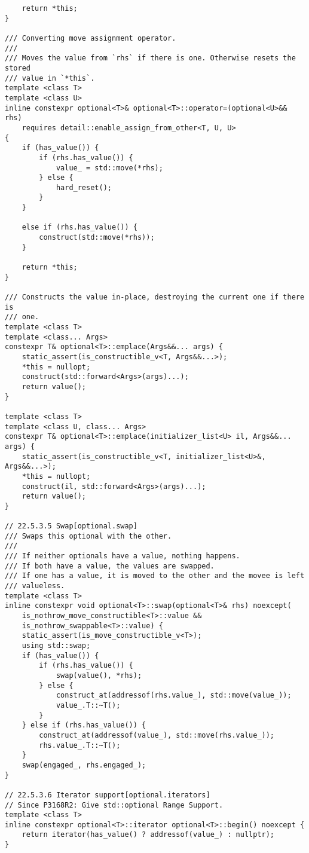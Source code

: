 \documentclass[a4paper,10pt,oneside,openany,final,article]{memoir}
\begin{document}
\begin{verbatim}
    return *this;
}

/// Converting move assignment operator.
///
/// Moves the value from `rhs` if there is one. Otherwise resets the stored
/// value in `*this`.
template <class T>
template <class U>
inline constexpr optional<T>& optional<T>::operator=(optional<U>&& rhs)
    requires detail::enable_assign_from_other<T, U, U>
{
    if (has_value()) {
        if (rhs.has_value()) {
            value_ = std::move(*rhs);
        } else {
            hard_reset();
        }
    }

    else if (rhs.has_value()) {
        construct(std::move(*rhs));
    }

    return *this;
}

/// Constructs the value in-place, destroying the current one if there is
/// one.
template <class T>
template <class... Args>
constexpr T& optional<T>::emplace(Args&&... args) {
    static_assert(is_constructible_v<T, Args&&...>);
    *this = nullopt;
    construct(std::forward<Args>(args)...);
    return value();
}

template <class T>
template <class U, class... Args>
constexpr T& optional<T>::emplace(initializer_list<U> il, Args&&... args) {
    static_assert(is_constructible_v<T, initializer_list<U>&, Args&&...>);
    *this = nullopt;
    construct(il, std::forward<Args>(args)...);
    return value();
}

// 22.5.3.5 Swap[optional.swap]
/// Swaps this optional with the other.
///
/// If neither optionals have a value, nothing happens.
/// If both have a value, the values are swapped.
/// If one has a value, it is moved to the other and the movee is left
/// valueless.
template <class T>
inline constexpr void optional<T>::swap(optional<T>& rhs) noexcept(
    is_nothrow_move_constructible<T>::value &&
    is_nothrow_swappable<T>::value) {
    static_assert(is_move_constructible_v<T>);
    using std::swap;
    if (has_value()) {
        if (rhs.has_value()) {
            swap(value(), *rhs);
        } else {
            construct_at(addressof(rhs.value_), std::move(value_));
            value_.T::~T();
        }
    } else if (rhs.has_value()) {
        construct_at(addressof(value_), std::move(rhs.value_));
        rhs.value_.T::~T();
    }
    swap(engaged_, rhs.engaged_);
}

// 22.5.3.6 Iterator support[optional.iterators]
// Since P3168R2: Give std::optional Range Support.
template <class T>
inline constexpr optional<T>::iterator optional<T>::begin() noexcept {
    return iterator(has_value() ? addressof(value_) : nullptr);
}


\end{verbatim}
\end{document}
